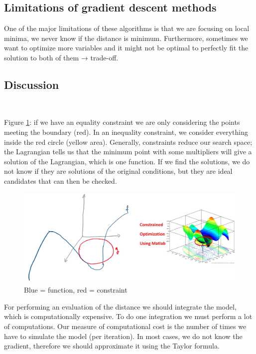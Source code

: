 \subsection{Limitations of gradient descent methods}

One of the major limitations of these algorithms is that we are focusing
on local minima, we never know if the distance is minimum. Furthermore,
sometimes we want to optimize more variables and it might not be optimal
to perfectly fit the solution to both of them → trade-off.


\subsection{Discussion}\

Figure \ref{fig:ex}: if we have an equality constraint we are only considering the points
meeting the boundary (red). In an inequality constraint, we consider
everything inside the red circle (yellow area). Generally, constraints
reduce our search space; the Lagrangian tells us that the minimum point
with some multipliers will give a solution of the Lagrangian, which is
one function. If we find the solutions, we do not know if they are
solutions of the original conditions, but they are ideal candidates that
can then be checked.

\begin{figure}
\centering
\includegraphics[width=\textwidth]{example.png}
\caption{Blue = function, red = constraint}
\label{fig:ex}
\end{figure}

\noindent
For performing an evaluation of the distance we should integrate the
model, which is computationally expensive. To do one integration we must
perform a lot of computations. Our measure of computational cost is the
number of times we have to simulate the model (per iteration).
\noindent
In most cases, we do not know the gradient, therefore we should
approximate it using the Taylor formula.


